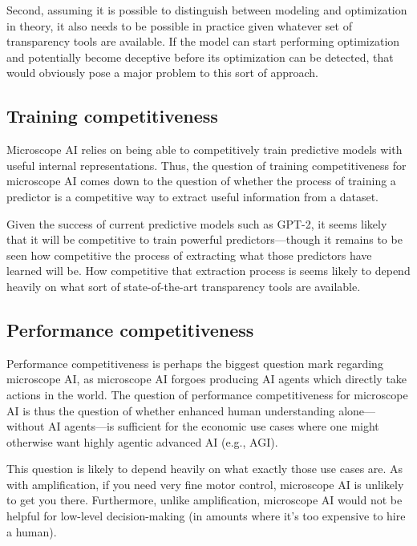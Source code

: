 \documentclass[
  onecolumn,
  natbib,
]{miri-tech-article}
\begin{document}
Second, assuming it is possible to distinguish between modeling and optimization in theory, it also needs to be possible in practice given whatever set of transparency tools are available. If the model can start performing optimization and potentially become deceptive before its optimization can be detected, that would obviously pose a major problem to this sort of approach.

\subsection{Training competitiveness} Microscope AI relies on being able to competitively train predictive models with useful internal representations. Thus, the question of training competitiveness for microscope AI comes down to the question of whether the process of training a predictor is a competitive way to extract useful information from a dataset.

Given the success of current predictive models such as GPT-2,\cite{language_models} it seems likely that it will be competitive to train powerful predictors---though it remains to be seen how competitive the process of extracting what those predictors have learned will be. How competitive that extraction process is seems likely to depend heavily on what sort of state-of-the-art transparency tools are available.

\subsection{Performance competitiveness} Performance competitiveness is perhaps the biggest question mark regarding microscope AI, as microscope AI forgoes producing AI agents which directly take actions in the world. The question of performance competitiveness for microscope AI is thus the question of whether enhanced human understanding alone---without AI agents---is sufficient for the economic use cases where one might otherwise want highly agentic advanced AI (e.g., AGI).

This question is likely to depend heavily on what exactly those use cases are. As with amplification, if you need very fine motor control, microscope AI is unlikely to get you there. Furthermore, unlike amplification, microscope AI would not be helpful for low-level decision-making (in amounts where it's too expensive to hire a human).
\end{document}
